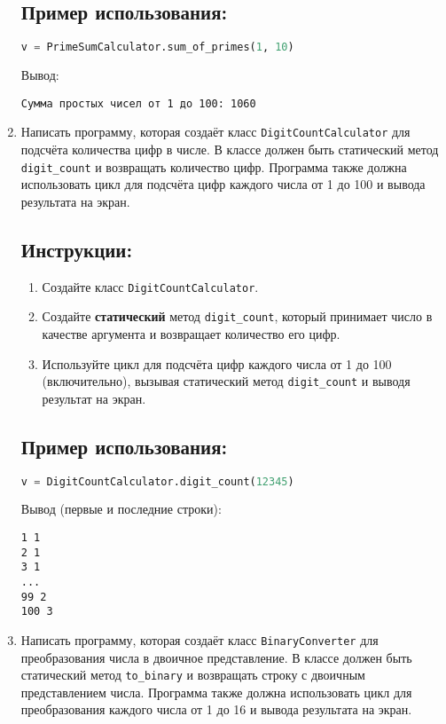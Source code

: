 \begin{enumerate}
\subsection*{Пример использования:}
\begin{lstlisting}[language=Python]
    v = PrimeSumCalculator.sum_of_primes(1, 10)
\end{lstlisting}
Вывод:
\begin{verbatim}
Сумма простых чисел от 1 до 100: 1060
\end{verbatim}

\item
Написать программу, которая создаёт класс \texttt{DigitCountCalculator} 
для подсчёта количества цифр в числе. В классе должен быть статический метод
\texttt{digit\_count} и возвращать количество цифр. 
Программа также должна использовать цикл для подсчёта цифр каждого числа от 
1 до 100 и вывода результата на экран.

\subsection*{Инструкции:}
\begin{enumerate}
    \item Создайте класс \texttt{DigitCountCalculator}.
    \item Создайте \textbf{статический} метод \texttt{digit\_count}, который принимает число в качестве аргумента и возвращает количество его цифр.
    \item Используйте цикл для подсчёта цифр каждого числа от 1 до 100 (включительно), вызывая статический метод \texttt{digit\_count} и выводя результат на экран.
\end{enumerate}

\subsection*{Пример использования:}
\begin{lstlisting}[language=Python]
    v = DigitCountCalculator.digit_count(12345)
\end{lstlisting}
Вывод (первые и последние строки):
\begin{verbatim}
1 1
2 1
3 1
...
99 2
100 3
\end{verbatim}

\item
Написать программу, которая создаёт класс \texttt{BinaryConverter} 
для преобразования числа в двоичное представление. В классе должен быть статический метод
\texttt{to\_binary} и возвращать строку с двоичным представлением числа. 
Программа также должна использовать цикл для преобразования каждого числа от 
1 до 16 и вывода результата на экран.


\end{enumerate}
